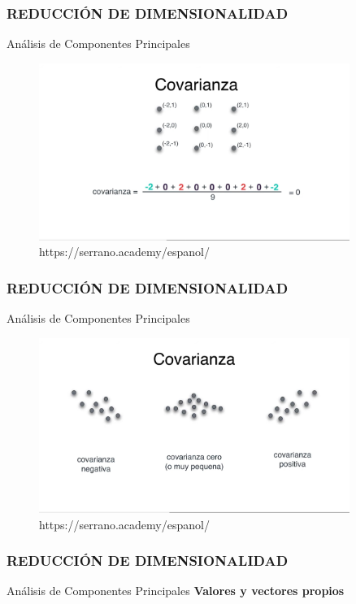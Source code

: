 \documentclass{beamer}
\begin{document}
\begin{frame}
	\frametitle{REDUCCIÓN DE DIMENSIONALIDAD}
	\begin{block}{Análisis de Componentes Principales}	
		\begin{figure}
			\includegraphics[width=0.9\textwidth]{PCA/IMG_3559.jpg}
			\caption{https://serrano.academy/espanol/}
		\end{figure}
	\end{block}
\end{frame}

\begin{frame}
	\frametitle{REDUCCIÓN DE DIMENSIONALIDAD}
	\begin{block}{Análisis de Componentes Principales}	
		\begin{figure}
			\includegraphics[width=0.9\textwidth]{PCA/IMG_3560.jpg}
			\caption{https://serrano.academy/espanol/}
		\end{figure}
	\end{block}
\end{frame}


\begin{frame}
	\frametitle{REDUCCIÓN DE DIMENSIONALIDAD}
\begin{block}{Análisis de Componentes Principales}	
\textbf{Valores y vectores propios}
\end{block}
\end{frame}
\end{document}
